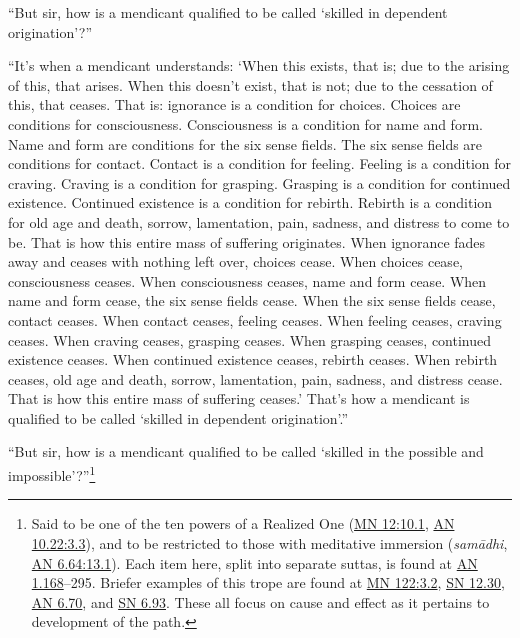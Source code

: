 \documentclass[12pt,openany]{book}%
\begin{document}
“But sir, how is a mendicant qualified to be called ‘skilled in dependent origination’?” 

“It’s when a mendicant understands: ‘When this exists, that is; due to the arising of this, that arises. When this doesn’t exist, that is not; due to the cessation of this, that ceases. That is: ignorance is a condition for choices. Choices are conditions for consciousness. Consciousness is a condition for name and form. Name and form are conditions for the six sense fields. The six sense fields are conditions for contact. Contact is a condition for feeling. Feeling is a condition for craving. Craving is a condition for grasping. Grasping is a condition for continued existence. Continued existence is a condition for rebirth. Rebirth is a condition for old age and death, sorrow, lamentation, pain, sadness, and distress to come to be. That is how this entire mass of suffering originates. When ignorance fades away and ceases with nothing left over, choices cease. When choices cease, consciousness ceases. When consciousness ceases, name and form cease. When name and form cease, the six sense fields cease. When the six sense fields cease, contact ceases. When contact ceases, feeling ceases. When feeling ceases, craving ceases. When craving ceases, grasping ceases. When grasping ceases, continued existence ceases. When continued existence ceases, rebirth ceases. When rebirth ceases, old age and death, sorrow, lamentation, pain, sadness, and distress cease. That is how this entire mass of suffering ceases.’ That’s how a mendicant is qualified to be called ‘skilled in dependent origination’.” 

“But sir, how is a mendicant qualified to be called ‘skilled in the possible and impossible’?”\footnote{Said to be one of the ten powers of a Realized One (\href{https://suttacentral.net/mn12/en/sujato\#10.1}{MN 12:10.1}, \href{https://suttacentral.net/an10.22/en/sujato\#3.3}{AN 10.22:3.3}), and to be restricted to those with meditative immersion (\textit{\textsanskrit{samādhi}}, \href{https://suttacentral.net/an6.64/en/sujato\#13.1}{AN 6.64:13.1}). Each item here, split into separate suttas, is found at \href{https://suttacentral.net/an1.168/en/sujato}{AN 1.168}–295. Briefer examples of this trope are found at \href{https://suttacentral.net/mn122/en/sujato\#3.2}{MN 122:3.2}, \href{https://suttacentral.net/sn12.30/en/sujato}{SN 12.30}, \href{https://suttacentral.net/an6.70/en/sujato}{AN 6.70}, and \href{https://suttacentral.net/sn6.93/en/sujato}{SN 6.93}. These all focus on cause and effect as it pertains to development of the path. } 
\end{document}
